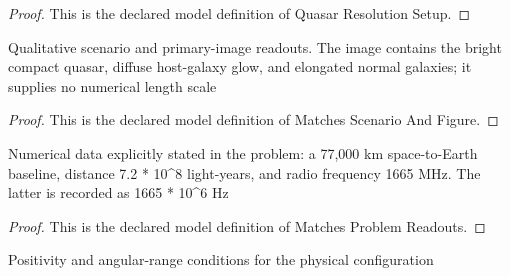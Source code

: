 \begin{proof}
  This is the declared model definition of Quasar Resolution Setup.
\end{proof}
\begin{definition}
  \label{def:physics:phyx-mini-0123:phyxminiproblems-problemphyxmini0123-matchesscenarioandfigure}
  Qualitative scenario and primary-image readouts. The image contains the bright compact quasar, diffuse host-galaxy glow, and elongated normal galaxies; it supplies no numerical length scale
\end{definition}
\begin{proof}
  This is the declared model definition of Matches Scenario And Figure.
\end{proof}
\begin{definition}
  \label{def:physics:phyx-mini-0123:phyxminiproblems-problemphyxmini0123-matchesproblemreadouts}
  Numerical data explicitly stated in the problem: a 77,000 km space-to-Earth baseline, distance 7.2 * 10\textasciicircum{}8 light-years, and radio frequency 1665 MHz. The latter is recorded as 1665 * 10\textasciicircum{}6 Hz
\end{definition}
\begin{proof}
  This is the declared model definition of Matches Problem Readouts.
\end{proof}
\begin{definition}
  \label{def:physics:phyx-mini-0123:phyxminiproblems-problemphyxmini0123-hasphysicalparameters}
  Positivity and angular-range conditions for the physical configuration
\end{definition}
